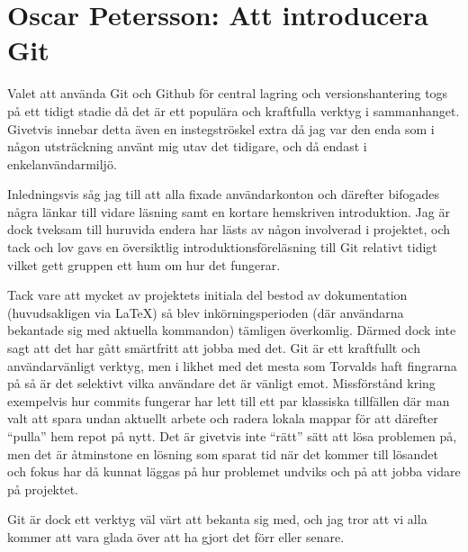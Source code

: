 \section{Oscar Petersson: Att introducera Git}

Valet att använda Git och Github för central lagring och versionshantering togs på ett tidigt stadie då det är ett populära och kraftfulla verktyg i sammanhanget. Givetvis innebar detta även en instegströskel extra då jag var den enda som i någon utsträckning använt mig utav det tidigare, och då endast i enkelanvändarmiljö.

Inledningsvis såg jag till att alla fixade användarkonton och därefter bifogades några länkar till vidare läsning samt en kortare hemskriven introduktion. Jag är dock tveksam till huruvida endera har lästs av någon involverad i projektet, och tack och lov gavs en översiktlig introduktionsföreläsning till Git relativt tidigt vilket gett gruppen ett hum om hur det fungerar.

Tack vare att mycket av projektets initiala del bestod av dokumentation (huvudsakligen via \LaTeX) så blev inkörningsperioden (där användarna bekantade sig med aktuella kommandon) tämligen överkomlig. Därmed dock inte sagt att det har gått smärtfritt att jobba med det. Git är ett kraftfullt och användarvänligt verktyg, men i likhet med det mesta som Torvalds haft fingrarna på så är det selektivt vilka användare det är vänligt emot. Missförstånd kring exempelvis hur commits fungerar har lett till ett par klassiska tillfällen där man valt att spara undan aktuellt arbete och radera lokala mappar för att därefter ``pulla'' hem repot på nytt. Det är givetvis inte ``rätt'' sätt att lösa problemen på, men det är åtminstone en lösning som sparat tid när det kommer till lösandet och fokus har då kunnat läggas på hur problemet undviks och på att jobba vidare på projektet.

Git är dock ett verktyg väl värt att bekanta sig med, och jag tror att vi alla kommer att vara glada över att ha gjort det förr eller senare.
